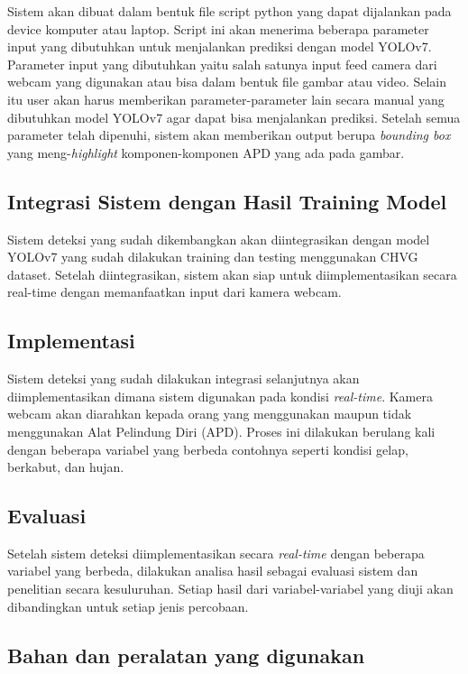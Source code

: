 Sistem akan dibuat dalam bentuk file script python yang dapat dijalankan pada device komputer atau laptop. Script ini akan menerima beberapa parameter input yang dibutuhkan untuk menjalankan prediksi dengan model YOLOv7. Parameter input yang dibutuhkan yaitu salah satunya input feed camera dari webcam yang digunakan atau bisa dalam bentuk file gambar atau video.
Selain itu user akan harus memberikan parameter-parameter lain secara manual yang dibutuhkan model YOLOv7 agar dapat bisa menjalankan prediksi. Setelah semua parameter telah dipenuhi, sistem akan memberikan output berupa \textit{bounding box} yang meng-\textit{highlight} komponen-komponen APD yang ada pada gambar.

\subsection{Integrasi Sistem dengan Hasil Training Model}
\label{subsec:integrasi}

Sistem deteksi yang sudah dikembangkan akan diintegrasikan dengan model YOLOv7 yang sudah dilakukan training dan testing menggunakan CHVG dataset. Setelah diintegrasikan, sistem akan siap untuk diimplementasikan secara real-time dengan memanfaatkan input dari kamera webcam.

\subsection{Implementasi}
\label{subsec:implementasi}

Sistem deteksi yang sudah dilakukan integrasi selanjutnya akan diimplementasikan dimana sistem digunakan pada kondisi \textit{real-time}. Kamera webcam akan diarahkan kepada orang yang menggunakan maupun tidak menggunakan Alat Pelindung Diri (APD). Proses ini dilakukan berulang kali dengan beberapa variabel yang berbeda contohnya seperti kondisi gelap, berkabut, dan hujan.

\subsection{Evaluasi}
\label{subsec:evaluasi}

Setelah sistem deteksi diimplementasikan secara \emph{real-time} dengan beberapa variabel yang berbeda, dilakukan analisa hasil sebagai evaluasi sistem dan penelitian secara kesuluruhan. Setiap hasil dari variabel-variabel yang diuji akan dibandingkan untuk setiap jenis percobaan.

\subsection{Bahan dan peralatan yang digunakan}
\label{subsec:peralatan}

